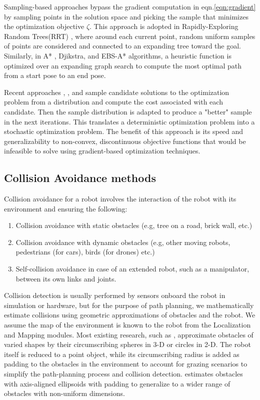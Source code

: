 Sampling-based approaches bypass the gradient computation in eqn.\ref{eqn:gradient} by sampling points in the solution space and picking the sample that minimizes the optimization objective $\zeta$. This approach is adopted in Rapidly-Exploring Random Trees(RRT) \cite{RRT-og}, where around each current point, random uniform samples of points are considered and connected to an expanding tree toward the goal. Similarly, in A* \cite{A*}, Djikstra, and EBS-A* \cite{EBS-A*} algorithms, a heuristic function is optimized over an expanding graph search to compute the most optimal path from a start pose to an end pose. 

Recent approaches \cite{STORM}, \cite{iCEM}, and \cite{VPSTO} sample candidate solutions to the optimization problem from a distribution and compute the cost associated with each candidate. Then the sample distribution is adapted to produce a "better" sample in the next iterations. This translates a deterministic optimization problem into a stochastic optimization problem. The benefit of this approach is its speed and generalizability to non-convex, discontinuous objective functions that would be infeasible to solve using gradient-based optimization techniques. 

\subsection{Collision Avoidance methods}

Collision avoidance for a robot involves the interaction of the robot with its environment and ensuring the following:

\begin{enumerate}
    \item Collision avoidance with static obstacles (e.g, tree on a road, brick wall, etc.)
    \item Collision avoidance with dynamic obstacles (e.g, other moving robots, pedestrians (for cars), birds (for drones) etc.)
    \item \label{point:self-collision}Self-collision avoidance in case of an extended robot, such as a manipulator, between its own links and joints.
\end{enumerate}

Collision detection is usually performed by sensors onboard the robot in simulation or hardware, but for the purpose of path planning, we mathematically estimate collisions using geometric approximations of obstacles and the robot. We assume the map of the environment is known to the robot from the Localization and Mapping modules. Most existing research, such as \cite{RVO}, approximate obstacles of varied shapes by their circumscribing spheres in 3-D or circles in 2-D. The robot itself is reduced to a point object, while its circumscribing radius is added as padding to the obstacles in the environment to account for grazing scenarios to simplify the path-planning process and collision detection. \cite{aks_ral21} estimates obstacles with axis-aligned ellipsoids with padding to generalize to a wider range of obstacles with non-uniform dimensions. 

